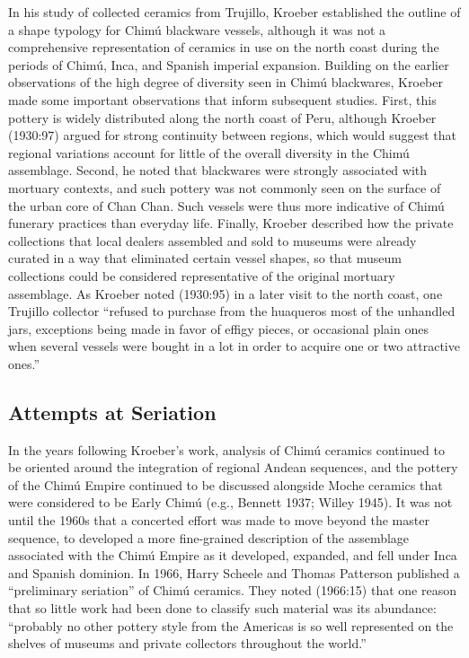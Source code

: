 \documentclass[]{interact}
\theoremstyle{plain}%
\theoremstyle{definition}
\theoremstyle{remark}
\begin{document}
In his study of collected ceramics from Trujillo, Kroeber established
the outline of a shape typology for Chimú blackware vessels, although it
was not a comprehensive representation of ceramics in use on the north
coast during the periods of Chimú, Inca, and Spanish imperial expansion.
Building on the earlier observations of the high degree of diversity
seen in Chimú blackwares, Kroeber made some important observations that
inform subsequent studies. First, this pottery is widely distributed
along the north coast of Peru, although Kroeber (1930:97) argued for
strong continuity between regions, which would suggest that regional
variations account for little of the overall diversity in the Chimú
assemblage. Second, he noted that blackwares were strongly associated
with mortuary contexts, and such pottery was not commonly seen on the
surface of the urban core of Chan Chan. Such vessels were thus more
indicative of Chimú funerary practices than everyday life. Finally,
Kroeber described how the private collections that local dealers
assembled and sold to museums were already curated in a way that
eliminated certain vessel shapes, so that museum collections could be
considered representative of the original mortuary assemblage. As
Kroeber noted (1930:95) in a later visit to the north coast, one
Trujillo collector ``refused to purchase from the huaqueros most of the
unhandled jars, exceptions being made in favor of effigy pieces, or
occasional plain ones when several vessels were bought in a lot in order
to acquire one or two attractive ones.''

\hypertarget{attempts-at-seriation}{%
\subsection{Attempts at Seriation}\label{attempts-at-seriation}}

In the years following Kroeber's work, analysis of Chimú ceramics
continued to be oriented around the integration of regional Andean
sequences, and the pottery of the Chimú Empire continued to be discussed
alongside Moche ceramics that were considered to be Early Chimú (e.g.,
Bennett 1937; Willey 1945). It was not until the 1960s that a concerted
effort was made to move beyond the master sequence, to developed a more
fine-grained description of the assemblage associated with the Chimú
Empire as it developed, expanded, and fell under Inca and Spanish
dominion. In 1966, Harry Scheele and Thomas Patterson published a
``preliminary seriation'' of Chimú ceramics. They noted (1966:15) that
one reason that so little work had been done to classify such material
was its abundance: ``probably no other pottery style from the Americas
is so well represented on the shelves of museums and private collectors
throughout the world.''
\end{document}
